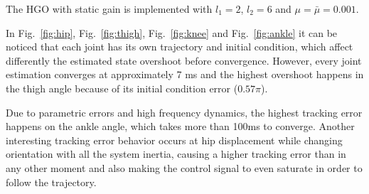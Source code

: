\documentclass[letterpaper, 10 pt, journal, twocolumn]{IEEEtran}  %
\theoremstyle{plain}
\theoremstyle{definition}
\theoremstyle{remark}
\begin{document}
The HGO with static gain is implemented with $l_1=2$, $l_2=6$ and $\mu=\bar{\mu}=0.001$.
%
%

In Fig.~\ref{fig:hip}, Fig.~\ref{fig:thigh}, Fig.~\ref{fig:knee} and Fig.~\ref{fig:ankle} it can be noticed that each joint has its own trajectory and initial condition, which affect differently the estimated state overshoot before convergence. However, every joint estimation converges at approximately 7 ms and the highest overshoot happens in the thigh angle because of its initial condition error ($0.57\pi$).

Due to parametric errors and high frequency dynamics, the highest tracking error happens on the ankle angle, which takes more than 100ms to converge. Another interesting tracking error behavior occurs at hip displacement while changing orientation with all the system inertia, causing a higher tracking error than in any other moment and also making the control signal to even saturate in order to follow the trajectory.  
\end{document}
